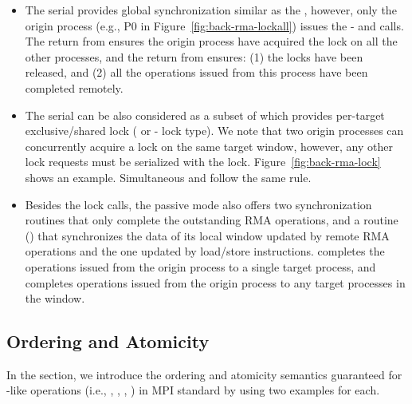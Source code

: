 \begin{itemize}
  \item The  serial provides global synchronization similar
  as the , however, only the origin process (e.g., P0 in
  Figure~\ref{fig:back-rma-lockall}) issues the -
  and  calls. The return from 
  ensures the origin process have acquired the  lock on all
  the other processes, and the return from  ensures:
  (1) the locks have been released, and (2) all the operations issued from
  this process have been completed remotely.

  \item The  serial can be also considered as a subset of 
  which provides per-target exclusive\slash shared lock (
  or - lock type). We note that two origin processes can
  concurrently acquire a  lock on the same target window, however,
  any other lock requests must be serialized with the  lock.
  Figure~\ref{fig:back-rma-lock} shows an example. Simultaneous 
  and  follow the same rule.

  \item Besides the lock calls, the passive mode also offers two 
  synchronization routines that only complete the outstanding RMA operations,
  and a  routine () that synchronizes the data
  of its local window updated by remote RMA operations and the one updated
  by load\slash store instructions.  completes the operations
  issued from the origin process to a single target process, and 
  completes operations issued from the origin process to any target processes
  in the window.
\end{itemize}


\subsection{Ordering and Atomicity}\label{sec:back-rma-semantic}

In the section, we introduce the ordering and atomicity semantics
guaranteed for -like operations (i.e., ,
, , )
in MPI standard by using two examples for each.

